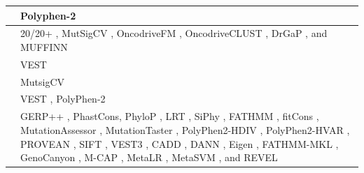 \begin{table}[!th]
{\begin{tabular}{L{4.7cm}L{17cm}}
\citet{Collier2019} & Polyphen-2 \cite{PolyPhen-2}\\ \hline
\citet{Zhu2019} & 20/20+ \cite{Tokheim2016}, MutSigCV \cite{lawrence2013mutational}, OncodriveFM \cite{Oncodrive-fm}, OncodriveCLUST  \cite{tamborero2013oncodriveclust}, DrGaP \cite{hua2013drgap}, and MUFFINN \cite{cho2016muffinn}\\ \hline
\citet{Colaprico2020}  & VEST \cite{carter2013identifying} \\ \hline
\citet{Gumpinger2020} & MutsigCV  \cite{lawrence2013mutational} \\ \hline
\citet{Lyu2020}  & VEST \cite{carter2013identifying}, PolyPhen-2 \cite{PolyPhen-2}\\ \hline
\citet{Wang2020} & GERP++ \cite{GERP++}, PhastCons, PhyloP \cite{PhyloP}, LRT \cite{LRT}, SiPhy \cite{garber2009identifying}, FATHMM \cite{shihab2013predicting}, fitCons \cite{gulko2015method}, MutationAssessor \cite{MutationAssessor}, MutationTaster \cite{schwarz2010mutationtaster}, PolyPhen2-HDIV \cite{PolyPhen-2}, PolyPhen2-HVAR \cite{PolyPhen-2}, PROVEAN \cite{choi2015provean}, SIFT \cite{ng2003sift}, VEST3 \cite{carter2013identifying}, CADD \cite{kircher2014general}, DANN \cite{quang2015dann}, Eigen \cite{ionita2016spectral}, FATHMM-MKL \cite{shihab2015integrative}, GenoCanyon \cite{lu2015statistical}, M-CAP \cite{jagadeesh2016m}, MetaLR \cite{dong2015comparison}, MetaSVM \cite{dong2015comparison}, and REVEL \cite{ioannidis2016revel} \\ \hline
\end{tabular}%
}
\end{table}

